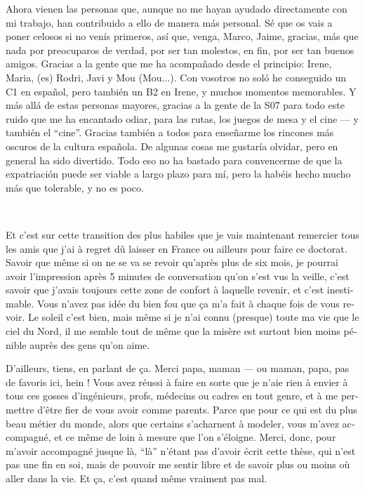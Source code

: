 \documentclass[../thesis.tex]{subfiles}
\begin{document}
\begin{es}
Ahora vienen las personas que, aunque no me hayan ayudado directamente con mi trabajo, han contribuido a ello de manera más personal.
Sé que os vais a poner celosos si no venís primeros, así que, venga, Marco, Jaime, gracias, más que nada por preocuparos de verdad, por ser tan molestos, en fin, por ser tan buenos amigos.
Gracias a la gente que me ha acompañado desde el principio: Irene, Maria, (es) Rodri, Javi y Mou (Mou...).
Con vosotros no soló he conseguido un C1 en español, pero también un B2 en Irene, y muchos momentos memorables.
Y más allá de estas personas mayores, gracias a la gente de la S07 para todo este ruido que me ha encantado odiar, para las rutas, los juegos de mesa y el cine --- y también el ``cine''.
Gracias también a todos para enseñarme los rincones más oscuros de la cultura española.
De algunas cosas me gustaría olvidar, pero en general ha sido divertido.
Todo eso no ha bastado para convencerme de que la expatriación puede ser viable a largo plazo para mí, pero la habéis hecho mucho más que tolerable, y no es poco.
\end{es}
\\

\begin{otherlanguage}{french}
Et c'est sur cette transition des plus habiles que je vais maintenant remercier tous les amis que j'ai à regret dû laisser en France ou ailleurs pour faire ce doctorat.
Savoir que même si on ne se va se revoir qu'après plus de six mois, je pourrai avoir l'impression après 5 minutes de conversation qu'on s'est vus la veille, c'est savoir que j'avais toujours cette zone de confort à laquelle revenir, et c'est inestimable.
Vous n'avez pas idée du bien fou que ça m'a fait à chaque fois de vous revoir.
Le soleil c'est bien, mais même si je n'ai connu (presque) toute ma vie que le ciel du Nord,
il me semble tout de même que la misère est surtout bien moins pénible auprès des gens qu'on aime.

D'ailleurs, tiens, en parlant de ça.
Merci papa, maman --- ou maman, papa, pas de favoris ici, hein !
Vous avez réussi à faire en sorte que je n'aie rien à envier à tous ces gosses d'ingénieurs, profs, médecins ou cadres en tout genre, et à me permettre d'être fier de vous avoir comme parents.
Parce que pour ce qui est du plus beau métier du monde, alors que certains s'acharnent à modeler, vous m'avez accompagné, et ce même de loin à mesure que l'on s'éloigne.
Merci, donc, pour m'avoir accompagné jusque là, ``là'' n'étant pas d'avoir écrit cette thèse, qui n'est pas une fin en soi, mais de pouvoir me sentir libre et de savoir plus ou moins où aller dans la vie.
Et ça, c'est quand même vraiment pas mal.
\end{otherlanguage}


\endgroup
\end{document}
